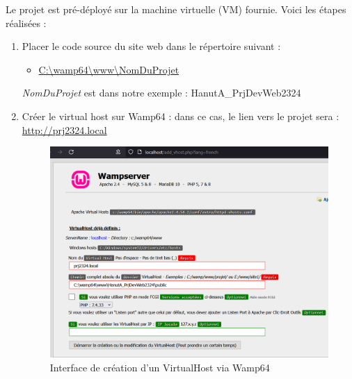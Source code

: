 Le projet est pré-déployé sur la machine virtuelle (VM) fournie. Voici les étapes réalisées :

\begin{enumerate}
	\item Placer le code source du site web dans le répertoire suivant :
	\begin{itemize}[label=$\bullet$]
		\item \url{C:\wamp64\www\NomDuProjet}
	\end{itemize}
	\textit{NomDuProjet} est dans notre exemple : HanutA\_PrjDevWeb2324
	
	
	\item Créer le virtual host sur Wamp64 : dans ce cas, le lien vers le projet sera : \\ \url{http://prj2324.local}
	\begin{figure}[h]
		\centering
		\includegraphics[keepaspectratio,width=15cm]{images/VirtualHost}
		\caption{Interface de création d'un VirtualHost via Wamp64}
	\end{figure}
\end{enumerate}